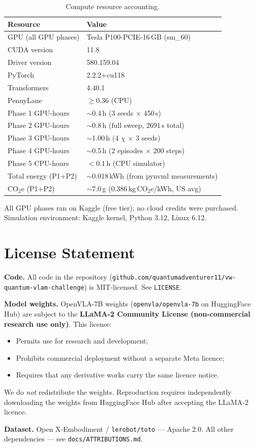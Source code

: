 \documentclass[10pt,twocolumn]{article}
\begin{document}
\begin{table}[h]
\centering
\small
\caption{Compute resource accounting.}
\begin{tabular}{ll}
\toprule
Resource & Value \\
\midrule
GPU (all GPU phases) & Tesla P100-PCIE-16\,GB (sm\_60) \\
CUDA version & 11.8 \\
Driver version & 580.159.04 \\
PyTorch & 2.2.2+cu118 \\
Transformers & 4.40.1 \\
PennyLane & $\geq$0.36 (CPU) \\
Phase 1 GPU-hours & $\sim$0.4\,h (3 seeds $\times$ 450\,s) \\
Phase 2 GPU-hours & $\sim$0.8\,h (full sweep, 2691\,s total) \\
Phase 3 GPU-hours & $\sim$1.00\,h (4 $\chi$ $\times$ 3 seeds) \\
Phase 4 GPU-hours & $\sim$0.5\,h (2 episodes $\times$ 200 steps) \\
Phase 5 CPU-hours & $<$0.1\,h (CPU simulator) \\
Total energy (P1+P2) & $\sim$0.018\,kWh (from pynvml measurements) \\
CO$_2$e (P1+P2) & $\sim$7.0\,g (0.386\,kg\,CO$_2$e/kWh, US avg) \\
\bottomrule
\end{tabular}
\end{table}

All GPU phases ran on Kaggle (free tier); no cloud credits were purchased.
Simulation environment: Kaggle kernel, Python 3.12, Linux 6.12.

\section{License Statement}
\label{app:license}

\textbf{Code.} All code in the repository
(\texttt{github.com/quantumadventurer11/vw-quantum-vlam-challenge}) is
MIT-licensed. See \texttt{LICENSE}.

\textbf{Model weights.} OpenVLA-7B weights (\texttt{openvla/openvla-7b} on
HuggingFace Hub) are subject to the
\textbf{LLaMA-2 Community License (non-commercial research use only)}.
This license:
\begin{itemize}
  \item Permits use for research and development;
  \item Prohibits commercial deployment without a separate Meta licence;
  \item Requires that any derivative works carry the same licence notice.
\end{itemize}
We do \emph{not} redistribute the weights. Reproduction requires independently
downloading the weights from HuggingFace Hub after accepting the LLaMA-2 licence.

\textbf{Dataset.} Open X-Embodiment / \texttt{lerobot/toto} --- Apache 2.0.
All other dependencies --- see \texttt{docs/ATTRIBUTIONS.md}.
\end{document}
